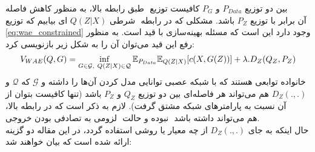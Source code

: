 طبق رابطه بالا، به منظور کاهش فاصله ‎\wasser{}‎ بین دو توزیع $P_{Data}‎$ و $P_G$ کافیست توزیع شرطی $Q(Z|X)$ ای بیابیم که توزیع ‎\marginal{}‎ آن برابر با توزیع $P_Z$ باشد. مشکلی که در رابطه ‎\ref{eq:wae_constrained}‎ وجود دارد این است که مسئله بهینه‌سازی با قید است. به منظور رفع این قید می‌توان آن را به شکل زیر بازنویسی کرد:
\begin{gather}
	V_{WAE}(Q, G) = \inf_{G \in \mathcal{G}, ~ Q(Z|X) \in \mathcal{Q}} \mathbb E_{P_{Data}}\mathbb E_{Q(Z|X)} [c(X, G(Z))] + \lambda . D_ Z(Q_Z, P_Z)
\end{gather}
که $‎\mathcal{Q}‎$  و ‎$‎\mathcal{G}$ خانواده توابعی هستند که با شبکه عصبی توانایی مدل کردن آن‌ها را داشته و $D_Z(. , .)$ هم می‌تواند هر فاصله‌ای بین دو توزیع $Q_Z$ و $P_Z$ باشد (تنها کافیست بتوان از آن نسبت به پارامترهای شبکه مشتق گرفت). لازم به ذکر است که در رابطه بالا، لزومی به تصادفی بودن خروجی ‎\encoder{}‎ نبوده و حالت  ‎\deterministic{}‎ هم می‌تواند داشته باشد.\\
حال اینکه به جای $D_Z(. , .)$ از چه معیار یا روشی استفاده گردد، در این مقاله دو گزینه ارائه شده است که بیان خواهند شد:
